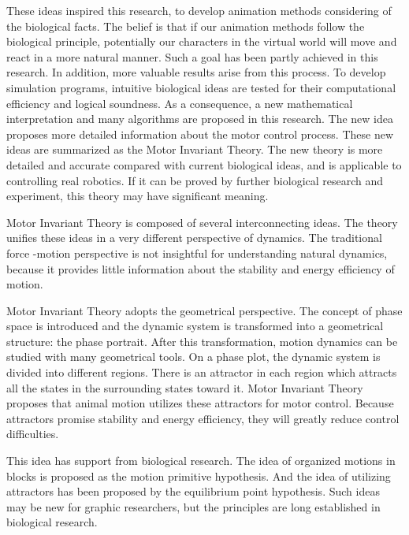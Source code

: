 These ideas inspired this research, to develop animation methods considering of the biological facts. 
The belief is that if our animation methods follow the biological principle, potentially our characters in the virtual world will move and react in a more natural manner. Such a goal has been partly achieved in this research.  
In addition, more valuable results arise from this process. 
To develop simulation programs, intuitive biological ideas are tested for their computational efficiency and logical soundness. 
As a consequence, a new mathematical interpretation and many algorithms are proposed in this research. 
The new idea proposes more detailed information about the motor control process. 
These new ideas are summarized as the Motor Invariant Theory. The new theory is more detailed and accurate compared with current biological ideas, and is applicable to controlling real robotics. 
If it can be proved by further biological research and experiment, this theory may have significant meaning.

Motor Invariant Theory is composed of several interconnecting ideas. 
The theory unifies these ideas in a very different perspective of dynamics. 
The traditional force -motion perspective is not insightful for understanding natural dynamics, because it provides little information about the stability and energy efficiency of motion. 

Motor Invariant Theory adopts the geometrical perspective. 
The concept of phase space is introduced and the dynamic system is transformed into a geometrical structure: the phase portrait. 
After this transformation, motion dynamics can be studied with many geometrical tools. 
On a phase plot, the dynamic system is divided into different regions. 
There is an attractor in each region which attracts all the states in the surrounding states toward it. 
Motor Invariant Theory proposes that animal motion utilizes these attractors for motor control. 
Because attractors promise stability and energy efficiency, they will greatly reduce control difficulties.
 
This idea has support from biological research. 
The idea of organized motions in blocks is proposed  as the motion primitive hypothesis. 
And the idea of utilizing attractors has been proposed by  the equilibrium point hypothesis. 
Such ideas may be new for graphic researchers, but the principles are long established in biological research.


